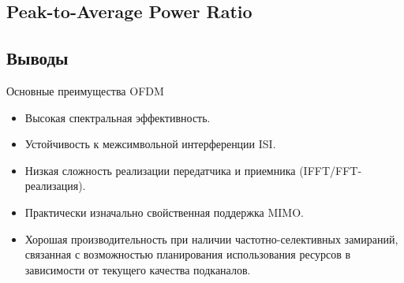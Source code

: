 \documentclass{book}
\numberwithin{theorem}{chapter}
\numberwithin{statement}{chapter}
\numberwithin{lemma}{chapter}
\theoremstyle{definition}
\numberwithin{task}{chapter}
\theoremstyle{remark}
\numberwithin{example}{chapter}
\theoremstyle{definition}
\numberwithin{definition}{chapter}
\theoremstyle{remark}
\theoremstyle{remark}
\numberwithin{lyrics}{section}
\begin{document}
\subsection{Peak-to-Average Power Ratio}

\subsection{Выводы}
Основные преимущества OFDM
\begin{itemize}
\item Высокая спектральная эффективность.
\item Устойчивость к межсимвольной интерференции ISI.
\item Низкая сложность реализации передатчика и приемника (IFFT/FFT-реализация).
\item Практически изначально свойственная поддержка MIMO.
\item Хорошая производительность при наличии частотно-селективных замираний, связанная с возможностью планирования использования ресурсов в зависимости от текущего качества подканалов.
\end{itemize}
\end{document}
